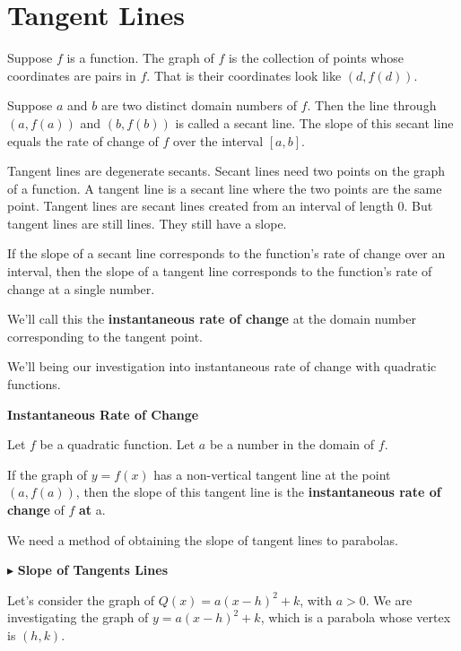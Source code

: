 \documentclass{ximera}
\begin{document}
\section{Tangent Lines}

Suppose $f$ is a function.  The graph of $f$ is the collection of points whose coordinates are pairs in $f$.  That is their coordinates look like $(d, f(d))$.

Suppose $a$ and $b$ are two distinct domain numbers of $f$.  Then the line through $(a, f(a))$ and $(b, f(b))$ is called a secant line.  The slope of this secant line equals the rate of change of $f$ over the interval $[a, b]$.

Tangent lines are degenerate secants. Secant lines need two points on the graph of a function.  A tangent line is a secant line where the two points are the same point. Tangent lines are secant lines created from an interval of length $0$.  But tangent lines are still lines.  They still have a slope.


If the slope of a secant line corresponds to the function's rate of change over an interval, then the slope of a tangent line corresponds to the function's rate of change at a single number.


We'll call this the \textbf{instantaneous rate of change} at the domain number corresponding to the tangent point.

We'll being our investigation into instantaneous rate of change with quadratic functions. \\


\begin{definition} \textbf{\textcolor{green!50!black}{Instantaneous Rate of Change}}  


Let $f$ be a quadratic function. Let $a$ be a number in the domain of $f$.

If the graph of $y = f(x)$ has a non-vertical tangent line at the point $(a, f(a))$, then the slope of this tangent line is the \textbf{instantaneous rate of change} of $f$ \textbf{at} a.


\end{definition}

We need a method of obtaining the slope of tangent lines to parabolas.


$\blacktriangleright$ \textbf{Slope of Tangents Lines}





Let's consider the graph of $Q(x) = a (x - h)^2 + k$, with $a > 0$. We are investigating the graph of $y = a (x - h)^2 + k$, which is a parabola whose vertex is $(h, k)$. \\
\end{document}
